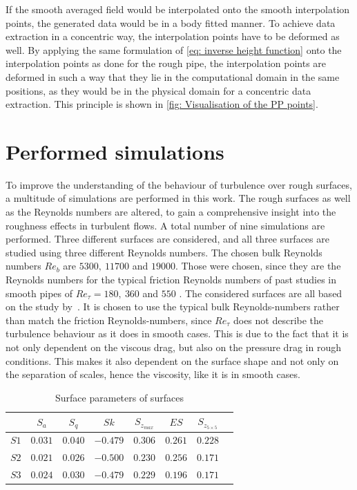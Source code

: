 If the smooth averaged field would be interpolated onto the smooth interpolation points, the generated data would be in a body fitted manner.
To achieve data extraction in a concentric way, the interpolation points have to be deformed as well. 
By applying the same formulation of \autoref{eq: inverse height function} onto the interpolation points as done for the rough pipe, the interpolation points are deformed in such a way that they lie in the computational domain in the same positions, as they would be in the physical domain for a concentric data extraction. This principle is shown in \autoref{fig: Visualisation of the PP points}.




\section{Performed simulations}\label{sec: performed simulations}
To improve the understanding of the behaviour of turbulence over rough surfaces, a multitude of simulations are performed in this work.
The rough surfaces as well as the Reynolds numbers are altered, to gain a comprehensive insight into the roughness effects in turbulent flows.
A total number of nine simulations are performed.
Three different surfaces are considered, and all three surfaces are studied using three different Reynolds numbers.
The chosen bulk Reynolds numbers $Re_b$ are $5300,\ 11700$ and $19000$.
Those were chosen, since they are the Reynolds numbers for the typical friction Reynolds numbers of past studies in smooth pipes of $Re_\tau = 180,\ 360$ and $550$ \citep{yaoDirectNumericalSimulations2023,elkhouryDirectNumericalSimulation2013,kimProgressPipeChannel2012}. 
The considered surfaces are all based on the study by~\cite{demaioDirectNumericalSimulation2023}.
It is chosen to use the typical bulk Reynolds-numbers rather than match the friction Reynolds-numbers, since $Re_\tau$ does not describe the turbulence behaviour as it does in smooth cases.
This is due to the fact that it is not only dependent on the viscous drag, but also on the pressure drag in rough conditions.
This makes it also dependent on the surface shape and not only on the separation of scales, hence the viscosity, like it is in smooth cases.\\
\begin{table}
    \centering
    \begin{tabular}{c c c c c c c c}
        \hline
                & $S_a$     & $S_q$     & $Sk$      & $S_{z_{max}}$ & $ES$      & $S_{z_{5 \times 5}}$\\
        \hline
        $S1$    & $0.031$   & $0.040$   & $-0.479$  & $0.306$       & $0.261$   & $0.228$ \\
        $S2$    & $0.021$   & $0.026$   & $-0.500$  & $0.230$       & $0.256$   & $0.171$ \\
        $S3$   & $0.024$   & $0.030$   & $-0.479$  & $0.229$       & $0.196$   & $0.171$ \\
        \hline
    \end{tabular}
    \caption{Surface parameters of surfaces}
    \label{tab: surface parameters of production runs}
\end{table}
